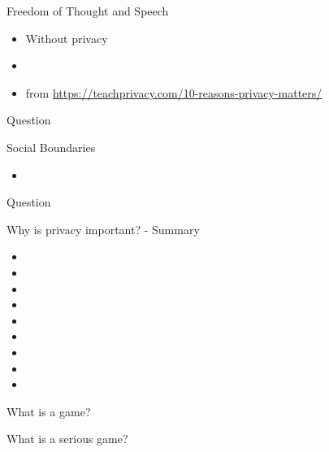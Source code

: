 \documentclass{beamer}
\begin{document}
\begin{frame}{Freedom of Thought and Speech}
\begin{itemize}
  \item Without privacy
  \item
  \item from \url{https://teachprivacy.com/10-reasons-privacy-matters/}
\end{itemize}
\begin{block}{Question}

\end{block}
\end{frame}


\begin{frame}{Social Boundaries}
\begin{itemize}
  \item
\end{itemize}
\begin{block}{Question}

\end{block}
\end{frame}


\begin{frame}{Why is privacy important? - Summary}
\begin{itemize}
  \item
  \item
  \item
  \item
  \item
  \item
  \item
  \item
  \item
\end{itemize}
\end{frame}


\begin{frame}{What is a game?}

\end{frame}


\begin{frame}{What is a serious game?}

\end{frame}
\end{document}
